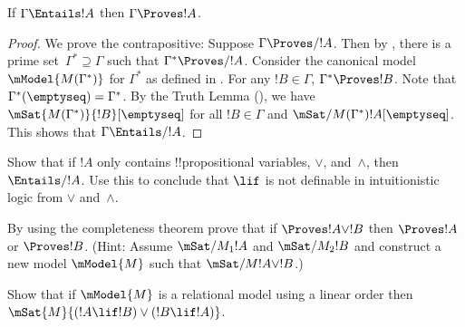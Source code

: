 \documentclass[../../../include/open-logic-section]{subfiles}
\begin{document}


\begin{thm}
  If $\Gamma \Entails !A$ then $\Gamma \Proves !A$.
\end{thm}

\begin{proof}
  We prove the contrapositive: Suppose $\Gamma \Proves/ !A$. Then by
  , there is a prime set~$\Gamma^*
  \supseteq \Gamma$ such that $\Gamma^* \Proves/ !A$. Consider the
  canonical model~$\mModel{M(\Gamma^*)}$ for $\Gamma^*$ as defined in
  . For any $!B \in \Gamma$, $\Gamma^*
  \Proves !B$. Note that $\Gamma^*(\emptyseq) = \Gamma^*$. By the Truth
  Lemma (), we have
  $\mSat{M(\Gamma^*)}{!B}[\emptyseq]$ for all $!B \in \Gamma$ and
  $\mSat/{M(\Gamma^*)}{!A}[\emptyseq]$. This shows that $\Gamma
  \Entails/ !A$.
\end{proof}

\begin{prob}
  Show that if $!A$ only contains !!{propositional variable}s, $\lor$,
  and~$\land$, then $\Entails/ !A$. Use this to conclude that $\lif$ is
  not definable in intuitionistic logic from $\lor$ and~$\land$. 
\end{prob}
  
\begin{prob}
  By using the completeness theorem prove that if $\Proves !A \lor !B$ then
  $\Proves !A$ or $\Proves !B$. (Hint: Assume $\mSat/{M_1}{!A}$ and
  $\mSat/{M_2}{!B}$ and construct a new model $\mModel{M}$ such that
  $\mSat/{M}{!A \lor !B}$.)
\end{prob}
  
\begin{prob} 
  Show that if $\mModel{M}$ is a relational model using a linear order then
  $\mSat{M}{(!A \lif !B)\lor(!B \lif !A)}$.
\end{prob}
\end{document}

